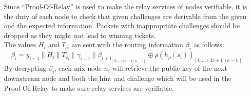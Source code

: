   Since “Proof-Of-Relay” is used to make the relay services of nodes verifiable, it is the duty of each node to check that given challenges are derivable from the given and the expected information.
Packets with inappropriate challenges should be dropped as they might not lead to winning tickets.
\\The values $H_i$ and $T_{c_i}$ are sent with the routing information $\beta_i$ as follows:
$$\beta_i=y_{i+1}\|H_i\|T_{c_i}\|\gamma_{i+1}\|\beta_{{i+1}_{[ \,0....(2r-1)\kappa-1\,] }}\oplus \rho(h_{\rho}(s_{i}))_{[ \,0....(2r+1)\kappa-1\,]}$$
By decrypting $\beta_i$, each mix node $n_i$ will retrieve the public key of the next downstream node and both the hint and challenge which will be used in the Proof Of Relay to make sure relay services are verifiable.

\begin{comment}
 \begin{figure}[H]
    \centering
    \begin{tabular}{| m{2em} | m{15em} | m{2em} |}
        \hline
        $\alpha$ & $\beta$                   & $\gamma$ \\
                 & \begin{tabular}{| c m{2em} | m{3em} | m{6em} |}
            \hline
            \multicolumn{2}{| c |}{$Y_B$} & $hint_B$                 & $challenge_{BC}$ \\
            \hline
            \multicolumn{2}{| c |}{$Y_C$} & $hint_C$                 & $random$         \\
            \hline
            \multicolumn{2}{| c |}{$Y_D$} & $hint_D$                 & $random$         \\
            \hline
            End                           & \multicolumn{3}{| l |}{}                    \\
            \hline
        \end{tabular} &          \\[3em]
        \hline
    \end{tabular}
    \caption{SPHINX with PoR}
    \label{fig:SPHINX with PoR}
\end{figure}
\end{comment}